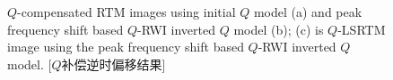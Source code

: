 \begin{figure}[!htbp]
    \centering
	{$Q$-compensated RTM images using initial
	$Q$ model (a) and peak frequency shift based $Q$-RWI inverted $Q$ model (b); (c) is 
	$Q$-LSRTM image using the peak frequency shift based $Q$-RWI inverted $Q$ model.}
    [$Q$补偿逆时偏移结果]
    \label{fig:rtm_fmodel}
\end{figure}

